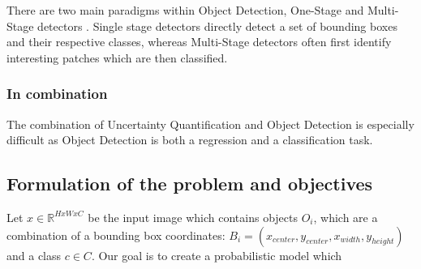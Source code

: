 There are two main paradigms within Object Detection, One-Stage \cite{zhou2019objects, bochkovskiy2020yolov4, wang2022yolov7} and Multi-Stage detectors \cite{girshick2014rich, girshick2015fast, }. Single stage detectors directly detect a set of bounding boxes and their respective classes, whereas Multi-Stage detectors often first identify interesting patches which are then classified.







\subsubsection{In combination}\label{sec:broadliterature:combination}
The combination of Uncertainty Quantification and Object Detection is especially difficult as Object Detection is both a regression and a classification task.

\cite{Gasperini_2022}

\subsection{Formulation of the problem and objectives}
Let $x \in \mathbb{R}^{HxWxC}$ be the input image which contains objects $O_i$, which are a combination of a bounding box coordinates: $B_i = (x_{center}, y_{center}, x_{width}, y_{height})$ and a class $c \in C$. Our goal is to create a probabilistic model which

\cite{Gasperini_2022}






